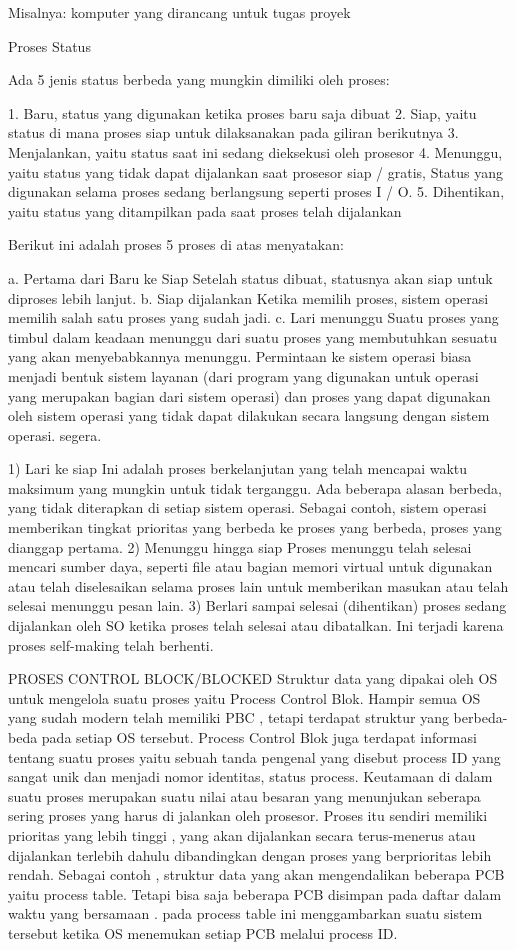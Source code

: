 Misalnya: komputer yang dirancang untuk tugas proyek

Proses Status

Ada 5 jenis status berbeda yang mungkin dimiliki oleh proses:

1. Baru, status yang digunakan ketika proses baru saja dibuat
2. Siap, yaitu status di mana proses siap untuk dilaksanakan pada giliran berikutnya
3. Menjalankan, yaitu status saat ini sedang dieksekusi oleh prosesor
4. Menunggu, yaitu status yang tidak dapat dijalankan saat prosesor siap / gratis, Status yang digunakan selama proses sedang berlangsung seperti proses I / O.
5. Dihentikan, yaitu status yang ditampilkan pada saat proses telah dijalankan

Berikut ini adalah proses 5 proses di atas menyatakan:

	a. Pertama dari Baru ke Siap
		Setelah status dibuat, statusnya akan siap untuk diproses lebih lanjut.
	b. Siap dijalankan
		Ketika memilih proses, sistem operasi memilih salah satu proses yang sudah jadi.
	c. Lari menunggu
		Suatu proses yang timbul dalam keadaan menunggu dari suatu proses yang membutuhkan sesuatu yang akan menyebabkannya menunggu. Permintaan ke sistem operasi biasa menjadi bentuk sistem layanan (dari program yang digunakan untuk operasi yang merupakan bagian dari sistem operasi) dan proses yang dapat digunakan oleh sistem operasi yang tidak dapat dilakukan secara langsung dengan sistem operasi. segera.

1) Lari ke siap
	Ini adalah proses berkelanjutan yang telah mencapai waktu maksimum yang mungkin untuk tidak terganggu. Ada beberapa alasan berbeda, yang tidak diterapkan di setiap sistem operasi. Sebagai contoh, sistem operasi memberikan tingkat prioritas yang berbeda ke proses yang berbeda, proses yang dianggap pertama.
2) Menunggu hingga siap
	Proses menunggu telah selesai mencari sumber daya, seperti file atau bagian memori virtual untuk digunakan atau telah diselesaikan selama proses lain untuk memberikan masukan atau telah selesai menunggu pesan lain.
3) Berlari sampai selesai (dihentikan)
	proses sedang dijalankan oleh SO ketika proses telah selesai atau dibatalkan. Ini terjadi karena proses self-making telah berhenti.

	PROSES CONTROL BLOCK/BLOCKED
Struktur data yang dipakai oleh OS untuk mengelola suatu proses yaitu Process Control Blok. Hampir semua OS yang sudah modern telah memiliki PBC , tetapi terdapat struktur yang berbeda-beda pada setiap OS tersebut. Process Control Blok juga terdapat informasi tentang suatu proses yaitu sebuah tanda pengenal yang disebut process ID yang sangat unik dan menjadi nomor identitas, status process. Keutamaan di dalam suatu proses merupakan suatu nilai atau besaran yang menunjukan seberapa sering proses yang harus di jalankan oleh prosesor. Proses itu sendiri memiliki prioritas yang lebih tinggi , yang akan dijalankan secara terus-menerus atau dijalankan terlebih dahulu dibandingkan dengan proses yang berprioritas lebih rendah. Sebagai contoh , struktur data yang akan mengendalikan beberapa PCB yaitu process table. Tetapi bisa saja beberapa PCB disimpan pada daftar dalam waktu yang bersamaan . pada process table ini menggambarkan suatu sistem tersebut ketika OS menemukan setiap PCB melalui process ID.

